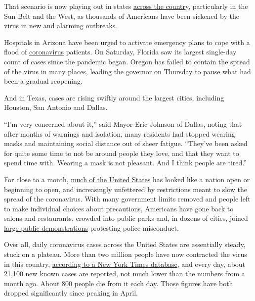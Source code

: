 That scenario is now playing out in states
\href{https://www.nytimes.com/interactive/2020/us/coronavirus-us-cases.html}{across
the country}, particularly in the Sun Belt and the West, as thousands of
Americans have been sickened by the virus in new and alarming outbreaks.

Hospitals in Arizona have been urged to activate emergency plans to cope
with a flood of
\href{https://www.nytimes.com/2020/06/15/health/coronavirus-underlying-conditions.html}{coronavirus}
patients. On Saturday, Florida saw its largest single-day count of cases
since the pandemic began. Oregon has failed to contain the spread of the
virus in many places, leading the governor on Thursday to pause what had
been a gradual reopening.

And in Texas, cases are rising swiftly around the largest cities,
including Houston, San Antonio and Dallas.

``I'm very concerned about it,'' said Mayor Eric Johnson of Dallas,
noting that after months of warnings and isolation, many residents had
stopped wearing masks and maintaining social distance out of sheer
fatigue. ``They've been asked for quite some time to not be around
people they love, and that they want to spend time with. Wearing a mask
is not pleasant. And I think people are tired.''

For close to a month,
\href{https://www.nytimes.com/interactive/2020/us/states-reopen-map-coronavirus.html}{much
of the United States} has looked like a nation open or beginning to
open, and increasingly unfettered by restrictions meant to slow the
spread of the coronavirus. With many government limits removed and
people left to make individual choices about precautions, Americans have
gone back to salons and restaurants, crowded into public parks and, in
dozens of cities, joined
\href{https://www.nytimes.com/news-event/george-floyd-protests-minneapolis-new-york-los-angeles}{large
public demonstrations} protesting police misconduct.

Over all, daily coronavirus cases across the United States are
essentially steady, stuck on a plateau. More than two million people
have now contracted the virus in this country,
\href{https://www.nytimes.com/interactive/2020/us/coronavirus-us-cases.html}{according
to a New York Times database}, and every day, about 21,100 new known
cases are reported, not much lower than the numbers from a month ago.
About 800 people die from it each day. Those figures have both dropped
significantly since peaking in April.

